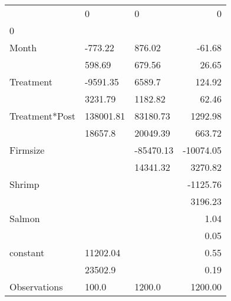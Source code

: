 \begin{tabular}{lllr}
\toprule
{} &          0 &         0 &         0 \\
0              &            &           &           \\
\midrule
Month          &    -773.22 &    876.02 &    -61.68 \\
               &     598.69 &    679.56 &     26.65 \\
Treatment      &   -9591.35 &    6589.7 &    124.92 \\
               &    3231.79 &   1182.82 &     62.46 \\
Treatment*Post &  138001.81 &  83180.73 &   1292.98 \\
               &    18657.8 &  20049.39 &    663.72 \\
Firmsize       &            & -85470.13 & -10074.05 \\
               &            &  14341.32 &   3270.82 \\
Shrimp         &            &           &  -1125.76 \\
               &            &           &   3196.23 \\
Salmon         &            &           &      1.04 \\
               &            &           &      0.05 \\
constant       &   11202.04 &           &      0.55 \\
               &    23502.9 &           &      0.19 \\
Observations   &      100.0 &    1200.0 &   1200.00 \\
\bottomrule
\end{tabular}

